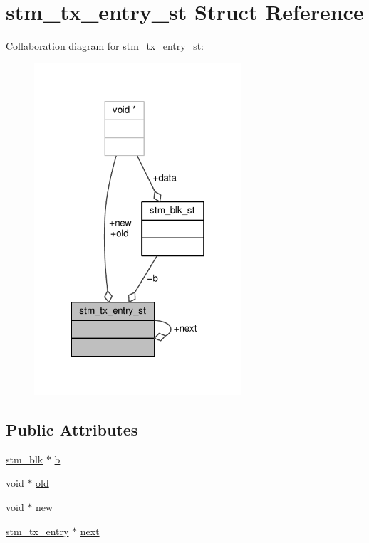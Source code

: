 \hypertarget{structstm__tx__entry__st}{\section{stm\-\_\-tx\-\_\-entry\-\_\-st Struct Reference}
\label{structstm__tx__entry__st}
}


Collaboration diagram for stm\-\_\-tx\-\_\-entry\-\_\-st\-:
\nopagebreak
\begin{figure}[H]
\begin{center}
\leavevmode
\includegraphics[width=218pt]{structstm__tx__entry__st__coll__graph}
\end{center}
\end{figure}
\subsection*{Public Attributes}
\begin{DoxyCompactItemize}
\item 
\hyperlink{stm_8h_a516da8305f9cec2fe40c7458fb7483e3}{stm\-\_\-blk} $\ast$ \hyperlink{structstm__tx__entry__st_a3d7517a664b7608a13c9634475cf1d73}{b}
\item 
void $\ast$ \hyperlink{structstm__tx__entry__st_af9269be64413d5abdf51d0a6953f2fb0}{old}
\item 
void $\ast$ \hyperlink{structstm__tx__entry__st_a0c24c492ae7ecdb9c59014101db84a59}{new}
\item 
\hyperlink{stm__fraser_8c_a4aacc05bcf38ac11ac911641876db633}{stm\-\_\-tx\-\_\-entry} $\ast$ \hyperlink{structstm__tx__entry__st_a891a5d83edca0b047a26a958795bf149}{next}
\end{DoxyCompactItemize}


